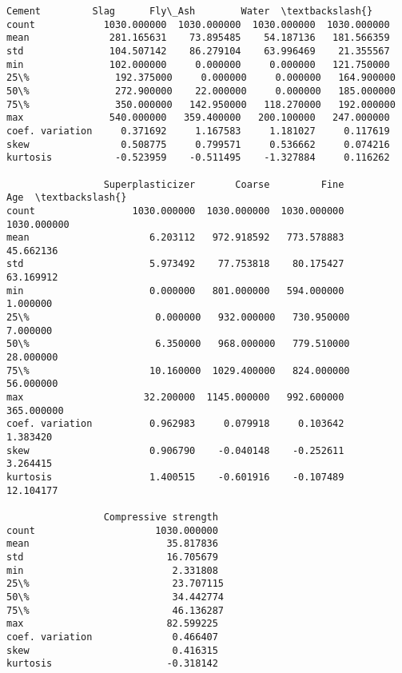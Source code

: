 \documentclass[11pt]{article}
\makeatletter
\newcommand{\boxspacing}{\kern\kvtcb@left@rule\kern\kvtcb@boxsep}
\newcommand{\prompt}[4]{
        {\ttfamily\llap{{\color{#2}[#3]:\hspace{3pt}#4}}\vspace{-\baselineskip}}
    }
\makeatother
\begin{document}
            \begin{tcolorbox}[breakable, size=fbox, boxrule=.5pt, pad at break*=1mm, opacityfill=0]
\prompt{Out}{outcolor}{6}{\boxspacing}
\begin{Verbatim}[commandchars=\\\{\}]
                      Cement         Slag      Fly\_Ash        Water  \textbackslash{}
count            1030.000000  1030.000000  1030.000000  1030.000000
mean              281.165631    73.895485    54.187136   181.566359
std               104.507142    86.279104    63.996469    21.355567
min               102.000000     0.000000     0.000000   121.750000
25\%               192.375000     0.000000     0.000000   164.900000
50\%               272.900000    22.000000     0.000000   185.000000
75\%               350.000000   142.950000   118.270000   192.000000
max               540.000000   359.400000   200.100000   247.000000
coef. variation     0.371692     1.167583     1.181027     0.117619
skew                0.508775     0.799571     0.536662     0.074216
kurtosis           -0.523959    -0.511495    -1.327884     0.116262

                 Superplasticizer       Coarse         Fine          Age  \textbackslash{}
count                 1030.000000  1030.000000  1030.000000  1030.000000
mean                     6.203112   972.918592   773.578883    45.662136
std                      5.973492    77.753818    80.175427    63.169912
min                      0.000000   801.000000   594.000000     1.000000
25\%                      0.000000   932.000000   730.950000     7.000000
50\%                      6.350000   968.000000   779.510000    28.000000
75\%                     10.160000  1029.400000   824.000000    56.000000
max                     32.200000  1145.000000   992.600000   365.000000
coef. variation          0.962983     0.079918     0.103642     1.383420
skew                     0.906790    -0.040148    -0.252611     3.264415
kurtosis                 1.400515    -0.601916    -0.107489    12.104177

                 Compressive strength
count                     1030.000000
mean                        35.817836
std                         16.705679
min                          2.331808
25\%                         23.707115
50\%                         34.442774
75\%                         46.136287
max                         82.599225
coef. variation              0.466407
skew                         0.416315
kurtosis                    -0.318142
\end{Verbatim}
\end{tcolorbox}
        
\end{document}
